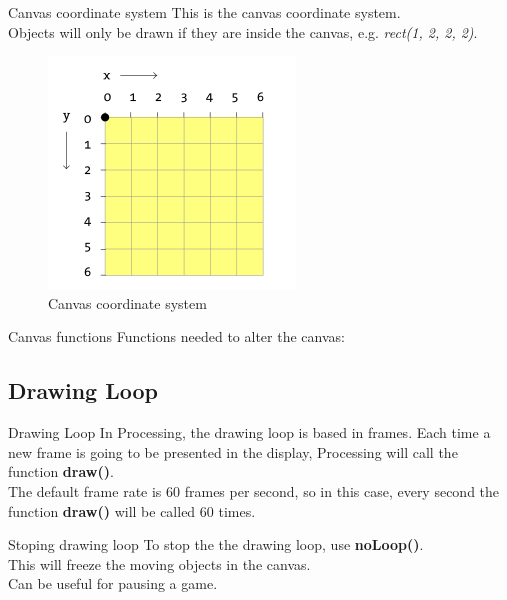 \documentclass{beamer}
\begin{document}
\begin{frame}{Canvas coordinate system}
This is the canvas coordinate system.\\
Objects will only be drawn if they are inside the canvas,
 e.g. \textit{rect(1, 2, 2, 2)}.

\begin{figure}[H]
\centerline{\includegraphics[scale=0.5]{canvas_coordinate_system.png}}
\caption{Canvas coordinate system}
\end{figure}
\end{frame}

\begin{frame}{Canvas functions}
Functions needed to alter the canvas:

\lstCanvasFunctions
\end{frame}

\subsection{Drawing Loop}

\begin{frame}{Drawing Loop}
In Processing, the drawing loop is based in frames.
Each time a new frame is going to be presented in the display,
Processing will call the function \textbf{draw()}.\\ 
The default frame rate is 60 frames per second, so in this case, 
every second the function \textbf{draw()} will be called 60 times.
\end{frame}

\begin{frame}{Stoping drawing loop}
To stop the the drawing loop, use \textbf{noLoop()}.\\
This will freeze the moving objects in the canvas.\\

Can be useful for pausing a game.
\end{frame}
\end{document}

